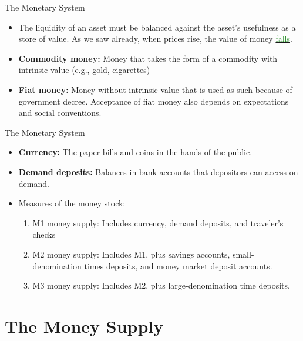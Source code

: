 \documentclass[xcolor={dvipsnames},pdf, hyperref={colorlinks=true, citecolor=ForestGreen, linkcolor=BlueViolet, urlcolor=Magenta}]{beamer}
\theoremstyle{definition}
\newcommand{\defn}[1]{\textbf{#1}}
\newcommand{\dd}[1]{{\underline{\textcolor{ForestGreen}{#1}}}}
\begin{document}
\begin{frame}{The Monetary System}
\begin{itemize}
	\item The liquidity of an asset must be balanced against the asset's usefulness as a store of value. As we saw already, when prices rise, the value of money \dd{falls}. 
	
	\item \defn{Commodity money:} Money that takes the form of a commodity with intrinsic value (e.g., gold, cigarettes)
	
	\item \defn{Fiat money:} Money without intrinsic value that is used as such because of government decree. Acceptance of fiat money also depends on expectations and social conventions.
\end{itemize}
\end{frame}

\begin{frame}{The Monetary System}
\begin{itemize}
	\item \defn{Currency:} The paper bills and coins in the hands of the public.
	
	\item \defn{Demand deposits:} Balances in bank accounts that depositors can access on demand.
	
	\item Measures of the money stock:
	\begin{enumerate}
		\item M1 money supply: Includes currency, demand deposits, and traveler's checks
		\item M2 money supply: Includes M1, plus savings accounts, small-denomination times deposits, and money market deposit accounts.
		\item M3 money supply: Includes M2, plus large-denomination time deposits.
	\end{enumerate}
\end{itemize}
\end{frame}

\section{The Money Supply}
\end{document}
